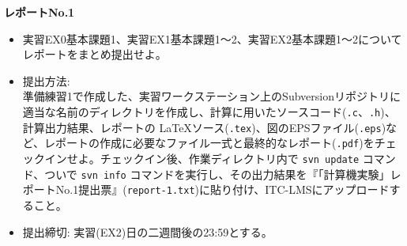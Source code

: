 \documentclass[11pt]{jarticle}
\begin{document}
\noindent
{\bf\large レポートNo.1}
\noindent
\begin{itemize}
\item 実習EX0基本課題1、実習EX1基本課題1〜2、実習EX2基本課題1〜2についてレポートをまとめ提出せよ。
\item 提出方法: \\
  準備練習1で作成した、実習ワークステーション上のSubversionリポジトリに適当な名前のディレクトリを作成し、計算に用いたソースコード({\tt *.c}、{\tt *.h})、計算出力結果、レポートの \LaTeX ソース({\tt *.tex})、図のEPSファイル({\tt *.eps})など、レポートの作成に必要なファイル一式と最終的なレポート({\tt *.pdf})をチェックインせよ。チェックイン後、作業ディレクトリ内で {\tt svn update} コマンド、ついで {\tt svn info} コマンドを実行し、その出力結果を『「計算機実験」レポートNo.1提出票』({\tt report-1.txt})に貼り付け、ITC-LMSにアップロードすること。
\item 提出締切: 実習(EX2)日の二週間後の23:59とする。
\end{itemize}
\end{document}
